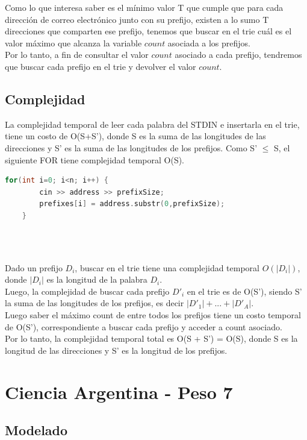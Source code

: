 \documentclass[a4paper]{article}
\begin{document}
Como lo que interesa saber es el mínimo valor T que cumple que para cada dirección de correo electrónico junto con su prefijo, existen a lo sumo T direcciones que comparten ese prefijo, tenemos que buscar en el trie cuál es el valor máximo que alcanza la variable $count$ asociada a los prefijos.\\
Por lo tanto, a fin de consultar el valor $count$ asociado a cada prefijo, tendremos que buscar cada prefijo en el trie y devolver el valor $count$.\\
\newpage

\subsection{Complejidad}
La complejidad temporal de leer cada palabra del STDIN e insertarla en el trie, tiene un costo de O(S+S'), donde S es la suma de las longitudes de las direcciones y S' es la suma de las longitudes de los prefijos. Como S' $\leq$ S, el siguiente FOR tiene complejidad temporal O(S).\\

\begin{lstlisting}[language=c++]
	for(int i=0; i<n; i++) {
		cin >> address >> prefixSize;
		prefixes[i] = address.substr(0,prefixSize);
	}
    
\end{lstlisting}
\

Dado un prefijo $D_{i}$, buscar en el trie tiene una complejidad temporal $O(|D_{i}|)$, donde $|D_{i}|$ es la longitud de la palabra $D_{i}$.\\
Luego, la complejidad de buscar cada prefijo $D'_{i}$ en el trie es de 
O(S'), siendo S' la suma de las longitudes de los prefijos, es decir $|D'_{1}|+...+|D'_{A}|$.\\
Luego saber el máximo count de entre todos los prefijos tiene un costo temporal de O(S'), correspondiente a buscar cada prefijo y acceder a count asociado.\\
Por lo tanto, la complejidad temporal total es O(S + S') = O(S), donde S es la longitud de las direcciones y S' es la longitud de los prefijos.

\newpage

\pagebreak
\section{Ciencia Argentina - Peso 7}
\subsection{Modelado}
\end{document}
